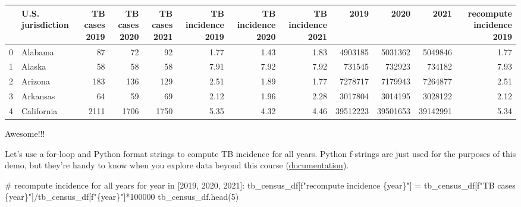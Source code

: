 \documentclass[
  letterpaper,
  DIV=11,
  numbers=noendperiod]{scrreprt}
\newenvironment{Shaded}{\begin{snugshade}}{\end{snugshade}}
\newcommand{\CommentTok}[1]{\textcolor[rgb]{0.37,0.37,0.37}{#1}}
\newcommand{\ControlFlowTok}[1]{\textcolor[rgb]{0.00,0.23,0.31}{#1}}
\newcommand{\DecValTok}[1]{\textcolor[rgb]{0.68,0.00,0.00}{#1}}
\newcommand{\KeywordTok}[1]{\textcolor[rgb]{0.00,0.23,0.31}{#1}}
\newcommand{\NormalTok}[1]{\textcolor[rgb]{0.00,0.23,0.31}{#1}}
\newcommand{\OperatorTok}[1]{\textcolor[rgb]{0.37,0.37,0.37}{#1}}
\newcommand{\SpecialCharTok}[1]{\textcolor[rgb]{0.37,0.37,0.37}{#1}}
\newcommand{\SpecialStringTok}[1]{\textcolor[rgb]{0.13,0.47,0.30}{#1}}
\begin{document}
\begin{tabular}{llrrrrrrrrrr}
\toprule
{} & U.S. jurisdiction &  TB cases 2019 &  TB cases 2020 &  TB cases 2021 &  TB incidence 2019 &  TB incidence 2020 &  TB incidence 2021 &      2019 &      2020 &      2021 &  recompute incidence 2019 \\
\midrule
0 &           Alabama &             87 &             72 &             92 &               1.77 &               1.43 &               1.83 &   4903185 &   5031362 &   5049846 &                      1.77 \\
1 &            Alaska &             58 &             58 &             58 &               7.91 &               7.92 &               7.92 &    731545 &    732923 &    734182 &                      7.93 \\
2 &           Arizona &            183 &            136 &            129 &               2.51 &               1.89 &               1.77 &   7278717 &   7179943 &   7264877 &                      2.51 \\
3 &          Arkansas &             64 &             59 &             69 &               2.12 &               1.96 &               2.28 &   3017804 &   3014195 &   3028122 &                      2.12 \\
4 &        California &           2111 &           1706 &           1750 &               5.35 &               4.32 &               4.46 &  39512223 &  39501653 &  39142991 &                      5.34 \\
\bottomrule
\end{tabular}

Awesome!!!

Let's use a for-loop and Python format strings to compute TB incidence
for all years. Python f-strings are just used for the purposes of this
demo, but they're handy to know when you explore data beyond this course
(\href{https://docs.python.org/3/tutorial/inputoutput.html}{documentation}).

\begin{Shaded}
\begin{Highlighting}[]
\CommentTok{\# recompute incidence for all years}
\ControlFlowTok{for}\NormalTok{ year }\KeywordTok{in}\NormalTok{ [}\DecValTok{2019}\NormalTok{, }\DecValTok{2020}\NormalTok{, }\DecValTok{2021}\NormalTok{]:}
\NormalTok{    tb\_census\_df[}\SpecialStringTok{f"recompute incidence }\SpecialCharTok{\{}\NormalTok{year}\SpecialCharTok{\}}\SpecialStringTok{"}\NormalTok{] }\OperatorTok{=}\NormalTok{ tb\_census\_df[}\SpecialStringTok{f"TB cases }\SpecialCharTok{\{}\NormalTok{year}\SpecialCharTok{\}}\SpecialStringTok{"}\NormalTok{]}\OperatorTok{/}\NormalTok{tb\_census\_df[}\SpecialStringTok{f"}\SpecialCharTok{\{}\NormalTok{year}\SpecialCharTok{\}}\SpecialStringTok{"}\NormalTok{]}\OperatorTok{*}\DecValTok{100000}
\NormalTok{tb\_census\_df.head(}\DecValTok{5}\NormalTok{)}
\end{Highlighting}
\end{Shaded}
\end{document}
